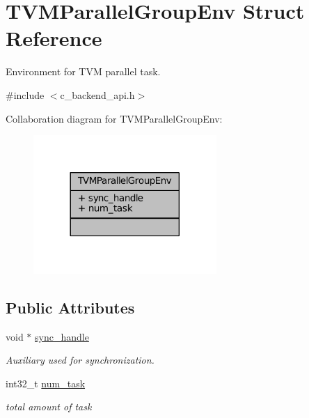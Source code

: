 \hypertarget{structTVMParallelGroupEnv}{}\section{T\+V\+M\+Parallel\+Group\+Env Struct Reference}
\label{structTVMParallelGroupEnv}


Environment for T\+VM parallel task.  




{\ttfamily \#include $<$c\+\_\+backend\+\_\+api.\+h$>$}



Collaboration diagram for T\+V\+M\+Parallel\+Group\+Env\+:
\nopagebreak
\begin{figure}[H]
\begin{center}
\leavevmode
\includegraphics[width=197pt]{structTVMParallelGroupEnv__coll__graph}
\end{center}
\end{figure}
\subsection*{Public Attributes}
\begin{DoxyCompactItemize}
\item 
void $\ast$ \hyperlink{structTVMParallelGroupEnv_a0633fa0370c01f1ab38948a53801d90c}{sync\+\_\+handle}
\begin{DoxyCompactList}\small\item\em Auxiliary used for synchronization. \end{DoxyCompactList}\item 
int32\+\_\+t \hyperlink{structTVMParallelGroupEnv_a6ff807972a918ee61dfc158abce825f6}{num\+\_\+task}
\begin{DoxyCompactList}\small\item\em total amount of task \end{DoxyCompactList}\end{DoxyCompactItemize}


